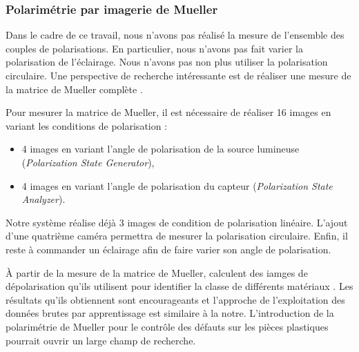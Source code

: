 
\subsubsection{Polarimétrie par imagerie de Mueller}
Dans le cadre de ce travail, nous n'avons pas réalisé la mesure de l'ensemble des couples de polarisations.
En particulier, nous n'avons pas fait varier la polarisation de l'éclairage.
Nous n'avons pas non plus utiliser la polarisation circulaire.
Une perspective de recherche intéressante est de réaliser une mesure de la matrice de Mueller complète \cite{pezzaniti_mueller_1995}.  %

Pour mesurer la matrice de Mueller, il est nécessaire de réaliser 16 images en variant les conditions de polarisation :
\begin{itemize}
	\item 4 images en variant l'angle de polarisation de la source lumineuse (\textit{Polarization State Generator}),
	\item 4 images en variant l'angle de polarisation du capteur (\textit{Polarization State Analyzer}).
\end{itemize}
Notre système réalise déjà 3 images de condition de polarisation linéaire.
L'ajout d'une quatrième caméra permettra de mesurer la polarisation circulaire.
Enfin, il reste à commander un éclairage afin de faire varier son angle de polarisation.

À partir de la mesure de la matrice de Mueller, \citeauthor{queau_learning_2019} calculent des iamges de dépolarisation qu'ils utilisent pour identifier la classe de différents matériaux \cite{queau_learning_2019}.
Les résultats qu'ils obtiennent sont encourageants et l'approche de l'exploitation des données brutes par apprentissage est similaire à la notre.
L'introduction de la polarimétrie de Mueller pour le contrôle des défauts sur les pièces plastiques pourrait ouvrir un large champ de recherche.

